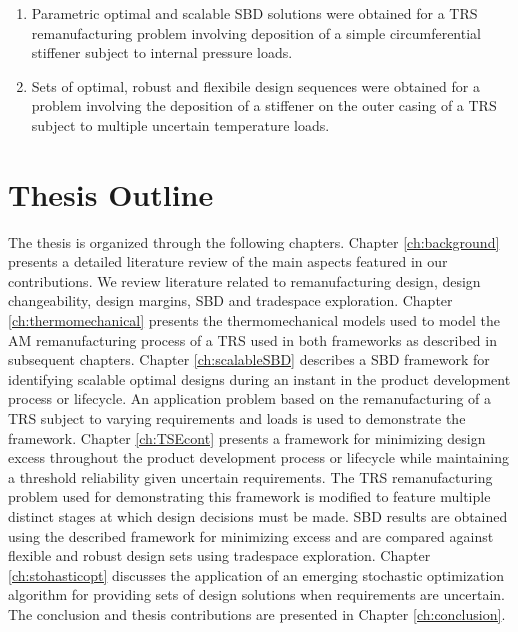 \begin{enumerate}
	\item{Parametric optimal and scalable \ac{SBD} solutions were obtained for a \ac{TRS} remanufacturing problem involving deposition of a simple circumferential stiffener subject to internal pressure loads.}
	\item{Sets of optimal, robust and flexibile design sequences were obtained for a problem involving the deposition of a stiffener on the outer casing of a \ac{TRS} subject to multiple uncertain temperature loads.}
\end{enumerate}

\section{Thesis Outline}
\label{sec:outline}

The thesis is organized through the following chapters. Chapter \ref{ch:background} presents a detailed literature review of the main aspects featured in our contributions. We review literature related to remanufacturing design, design changeability, design margins, \ac{SBD} and tradespace exploration. Chapter \ref{ch:thermomechanical} presents the thermomechanical models used to model the \ac{AM} remanufacturing process of a \ac{TRS} used in both frameworks as described in subsequent chapters. Chapter \ref{ch:scalableSBD} describes a \ac{SBD} framework for identifying scalable optimal designs during an instant in the product development process or lifecycle. An application problem based on the remanufacturing of a \ac{TRS} subject to varying requirements and loads is used to demonstrate the framework. Chapter \ref{ch:TSEcont} presents a framework for minimizing design excess throughout the product development process or lifecycle while maintaining a threshold reliability given uncertain requirements. The \ac{TRS} remanufacturing problem used for demonstrating this framework is modified to feature multiple distinct stages at which design decisions must be made. \ac{SBD} results are obtained using the described framework for minimizing excess and are compared against flexible and robust design sets using tradespace exploration. Chapter \ref{ch:stohasticopt} discusses the application of an emerging stochastic optimization algorithm for providing sets of design solutions when requirements are uncertain. The conclusion and thesis contributions are presented in Chapter \ref{ch:conclusion}.